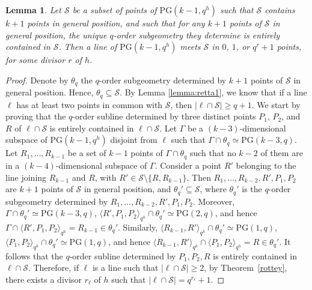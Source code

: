 \documentclass[11pt]{article}
\newtheorem{lemma}[theorem]{Lemma}
\theoremstyle{definition}
\numberwithin{equation}{section}
\def\cS{\mathcal S}
\def\PG{\mathrm{PG}}
\begin{document}
\begin{lemma} \label{lemma:retta2}
Let $\cS$ be a subset of points of $\PG(k-1,q^h)$ such that $\cS$ contains $k+1$ points in general position, and such that for any 
$k+1$ points of $\cS$ in general position, the unique $q$-order 
subgeometry they determine is entirely contained in $\cS$. Then a line of $\PG(k-1, q^h)$ meets $\cS$ in $0$, $1$, or $q^r+1$ points, for some divisor $r$ of $h$.    
\end{lemma} 
\begin{proof}
Denote by $\theta_q$ the $q$-order subgeometry determined by $k+1$ points of $\cS$ in general position. Hence, $\theta_q \subseteq \cS$. By Lemma \ref{lemma:retta1}, we know that if a line $\ell$ has at least two points in common with $\mathcal S$, then $|\ell \cap \mathcal S| \ge q+1$. We start by proving that the $q$-order subline determined by three distinct points 
$P_1$, $P_2$, and $R$ of $\ell \cap \mathcal S$ is entirely contained in $\ell \cap \mathcal S$. 
Let $\Gamma$ be a $(k-3)$-dimensional subspace of $\PG(k-1, q^h)$ disjoint from $\ell$ such that $\Gamma \cap \theta_q \simeq \PG(k-3, q)$. Let $R_1, \dots, R_{k-1}$ be a set of $k-1$ points of $\Gamma \cap \theta_q$ such that no $k-2$ of them are in a $(k-4)$-dimensional subspace of $\Gamma$. Consider a point $R'$ belonging to the line joining $R_{k-1}$ and $R$, with $R' \in \cS \setminus \{R, R_{k-1}\}$. Then $R_1, \dots, R_{k-2}, R', P_1, P_2$ are $k+1$ points of $\cS$ in general position, and $\theta_q' \subseteq \cS$, where $\theta_q'$ is the $q$-order subgeometry  determined by $R_1, \dots, R_{k-2}, R', P_1, P_2$. Moreover, $\Gamma \cap \theta_q' \simeq \PG(k-3, q)$, $\langle R', P_1, P_2 \rangle_{q^h} \cap \theta_q' \simeq \PG(2, q)$, and hence $\Gamma \cap \langle R', P_1, P_2 \rangle_{q^h} = R_{k-1} \in \theta_q'$. Similarly, $\langle R_{k-1}, R' \rangle_{q^h} \cap \theta_q' \simeq \PG(1, q)$, $\langle P_1, P_2 \rangle_{q^h} \cap \theta_q' \simeq \PG(1, q)$, and hence $\langle R_{k-1}, R' \rangle_{q^h} \cap \langle P_1, P_2 \rangle_{q^h} = R \in \theta_q'$. It follows that the $q$-order subline determined by $P_1, P_2, R$ is entirely contained in $\ell \cap \cS$. Therefore, if $\ell$ is a line such that $|\ell \cap \cS| \ge 2$, by Theorem~\ref{rottey}, there exists a divisor $r_\ell$ of $h$ such that $|\ell \cap \cS| = q^{r_\ell}+1$. 


\end{proof}
\end{document}
